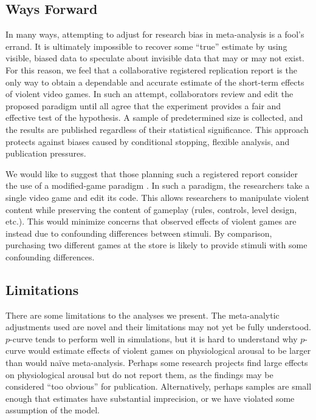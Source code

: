 \documentclass[man]{apa6}
\begin{document}
\subsection{Ways Forward}
In many ways, attempting to adjust for research bias in meta-analysis is a fool's errand. It is ultimately impossible to recover some ``true'' estimate by using visible, biased data to speculate about invisible data that may or may not exist. For this reason, we feel that a collaborative registered replication report is the only way to obtain a dependable and accurate estimate of the short-term effects of violent video games. In such an attempt, collaborators review and edit the proposed paradigm until all agree that the experiment provides a fair and effective test of the hypothesis. A sample of predetermined size is collected, and the results are published regardless of their statistical significance. This approach protects against biases caused by conditional stopping, flexible analysis, and publication pressures.

We would like to suggest that those planning such a registered report consider the use of a modified-game paradigm \citep{Elson:Quandt:2014,Engelhardt:etal:2015a,Engelhardt:etal:2015,Elson:etal:2013,Kneer:etal:inpress,Hilgard:2015}. In such a paradigm, the researchers take a single video game and edit its code. This allows researchers to manipulate violent content while preserving the content of gameplay (rules, controls, level design, etc.). This would minimize concerns that observed effects of violent games are instead due to confounding differences between stimuli. By comparison, purchasing two different games at the store is likely to provide stimuli with some confounding differences.

\subsection{Limitations}
There are some limitations to the analyses we present. The meta-analytic adjustments used are novel and their limitations may not yet be fully understood. $p$-curve tends to perform well in simulations, but it is hard to understand why $p$-curve would estimate effects of violent games on physiological arousal to be larger than would na{\"i}ve meta-analysis. Perhaps some research projects find large effects on physiological arousal but do not report them, as the findings may be considered ``too obvious'' for publication. Alternatively, perhaps samples are small enough that estimates have substantial imprecision, or we have violated some assumption of the model.
\end{document}
